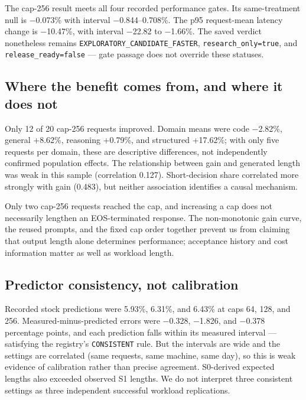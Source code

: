 \documentclass[
  11pt,
]{article}
\newcounter{none} %
\begin{document}
The cap-256 result meets all four recorded performance gates. Its
same-treatment null is −0.073\% with interval −0.844--0.708\%. The p95
request-mean latency change is −10.47\%, with interval −22.82 to
−1.66\%. The saved verdict nonetheless remains
\texttt{EXPLORATORY\_CANDIDATE\_FASTER}, \texttt{research\_only=true},
and \texttt{release\_ready=false} --- gate passage does not override
these statuses.

\subsection{Where the benefit comes from, and where it does
not}\label{where-the-benefit-comes-from-and-where-it-does-not}

Only 12 of 20 cap-256 requests improved. Domain means were code −2.82\%,
general +8.62\%, reasoning +0.79\%, and structured +17.62\%; with only
five requests per domain, these are descriptive differences, not
independently confirmed population effects. The relationship between
gain and generated length was weak in this sample (correlation 0.127).
Short-decision share correlated more strongly with gain (0.483), but
neither association identifies a causal mechanism.

Only two cap-256 requests reached the cap, and increasing a cap does not
necessarily lengthen an EOS-terminated response. The non-monotonic gain
curve, the reused prompts, and the fixed cap order together prevent us
from claiming that output length alone determines performance;
acceptance history and cost information matter as well as workload
length.

\subsection{Predictor consistency, not
calibration}\label{predictor-consistency-not-calibration}

Recorded stock predictions were 5.93\%, 6.31\%, and 6.43\% at caps 64,
128, and 256. Measured-minus-predicted errors were −0.328, −1.826, and
−0.378 percentage points, and each prediction falls within its measured
interval --- satisfying the registry's \texttt{CONSISTENT} rule. But the
intervals are wide and the settings are correlated (same requests, same
machine, same day), so this is weak evidence of calibration rather than
precise agreement. S0-derived expected lengths also exceeded observed S1
lengths. We do not interpret three consistent settings as three
independent successful workload replications.
\end{document}
